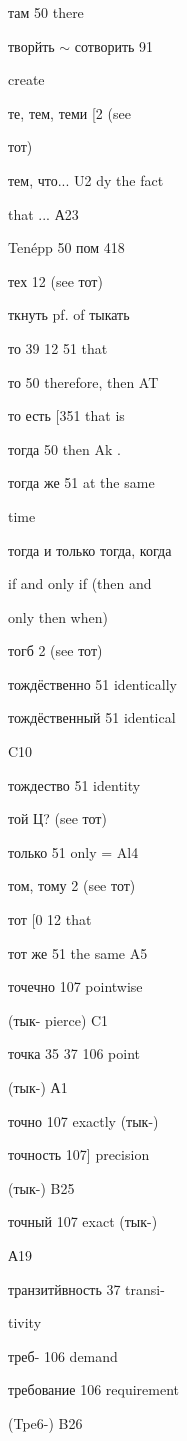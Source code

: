 \begin{minipage}[t]{0.475\textwidth}
\raggedright
\noindent там 50 there\par
\noindent творйть $\sim$ сотворить 91\par
\noindent create\par
\noindent те, тем, теми [2 (see\par
\noindent тот)\par
\noindent тем, что... U2 dy the fact\par
\noindent that ... А23\par
\noindent Tenépp 50 пом 418\par
\noindent тех 12 (see тот)\par
\noindent ткнуть pf. of тыкать\par
\noindent то 39 12 51 that\par
\noindent то 50 therefore, then AT\par
\noindent то есть [351 that is\par
\noindent тогда 50 then Ak .\par
\noindent тогда же 51 at the same\par
\noindent time\par
\noindent тогда и только тогда, когда\par
{} if and only if (then and\par
\noindent only then when)\par
\noindent тогб 2 (see тот)\par
\noindent тождёственно 51 identically\par
\noindent тождёственный 51 identical\par
\noindent C10\par
\noindent тождество 51 identity\par
\noindent той Ц? (see тот)\par
\noindent только 51 only = Al4\par
\noindent том, тому 2 (see тот)\par
\noindent тот [0 12 that\par
\noindent тот же 51 the same A5\par
\noindent точечно 107 pointwise\par
\noindent (тык- pierce) C1\par
\noindent точка 35 37 106 point\par
\noindent (тык-) А1\par
\noindent точно 107 exactly (тык-)\par
\noindent точность 107] precision\par
\noindent (тык-) B25\par
\noindent точный 107 exact (тык-)\par
\noindent А19\par
\noindent транзитйвность 37 transi-\par
\noindent tivity\par
\noindent треб- 106 demand\par
\noindent требование 106 requirement\par
\noindent (Tpe6-) B26\par
\end{minipage}\hfill
